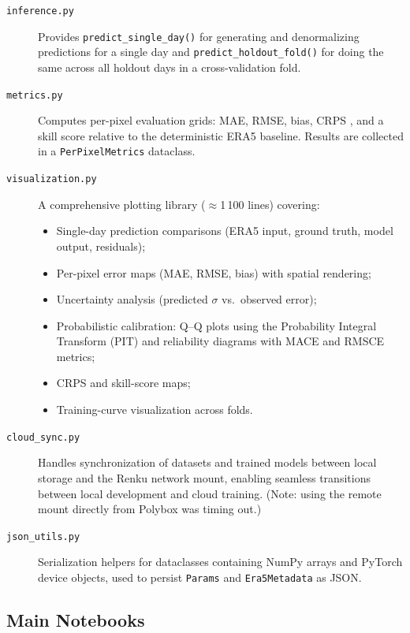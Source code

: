 \begin{description}
  \item[\texttt{inference.py}]
  Provides \texttt{predict\_single\_day()} for generating and denormalizing predictions for a single day and \texttt{predict\_holdout\_fold()} for doing the same across all holdout days in a cross-validation fold.

  \item[\texttt{metrics.py}]
  Computes per-pixel evaluation grids: MAE, RMSE, bias, CRPS , and a skill score relative to the deterministic ERA5 baseline.
  Results are collected in a \texttt{PerPixelMetrics} dataclass.

  \item[\texttt{visualization.py}]
  A comprehensive plotting library ($\approx$1\,100 lines) covering:
  \begin{itemize}
    \item Single-day prediction comparisons (ERA5 input, ground truth, model output, residuals);
    \item Per-pixel error maps (MAE, RMSE, bias) with spatial rendering;
    \item Uncertainty analysis (predicted $\sigma$ vs.\ observed error);
    \item Probabilistic calibration: Q--Q plots using the Probability Integral Transform (PIT) and reliability diagrams with MACE and RMSCE metrics;
    \item CRPS and skill-score maps;
    \item Training-curve visualization across folds.
  \end{itemize}

  \item[\texttt{cloud\_sync.py}]
  Handles synchronization of datasets and trained models between local storage and the Renku network mount, enabling seamless transitions between local development and cloud training. (Note: using the remote mount directly from Polybox was timing out.)

  \item[\texttt{json\_utils.py}]
  Serialization helpers for dataclasses containing NumPy arrays and PyTorch device objects, used to persist \texttt{Params} and \texttt{Era5Metadata} as JSON.

\end{description}

\subsection{Main Notebooks}

